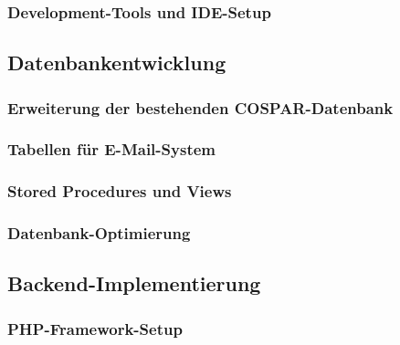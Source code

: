\documentclass[11pt,a4paper]{article}
\begin{document}
\subsubsection{Development-Tools und IDE-Setup}

\subsection{Datenbankentwicklung}

\subsubsection{Erweiterung der bestehenden COSPAR-Datenbank}

\subsubsection{Tabellen für E-Mail-System}

\subsubsection{Stored Procedures und Views}

\subsubsection{Datenbank-Optimierung}

\subsection{Backend-Implementierung}

\subsubsection{PHP-Framework-Setup}
\end{document}
